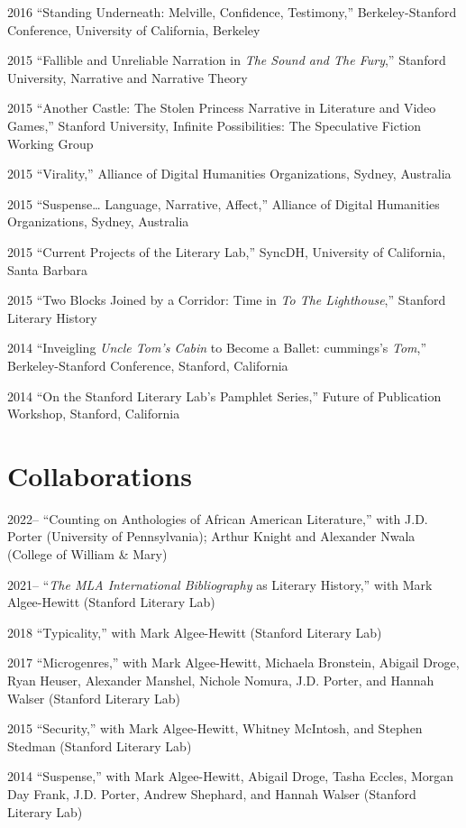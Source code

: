 \documentclass[12pt,letterpaper]{report}
\begin{document}
\begin{tablist}
	\item[2016] \tab{}\enquote{Standing Underneath: Melville, Confidence, Testimony,} Berkeley-Stanford Conference, University of California, Berkeley
	\item[2015] \tab{}\enquote{Fallible and Unreliable Narration in \emph{The Sound and The Fury},} Stanford University, Narrative and Narrative Theory
	\item[2015] \tab{}\enquote{Another Castle: The Stolen Princess Narrative in Literature and Video Games,} Stanford University, Infinite Possibilities: The Speculative Fiction Working Group
	\item[2015] \tab{}\enquote{Virality,} Alliance of Digital Humanities Organizations, Sydney, Australia
	\item[2015] \tab{}\enquote{Suspense… Language, Narrative, Affect,} Alliance of Digital Humanities Organizations, Sydney, Australia
	\item[2015] \tab{}\enquote{Current Projects of the Literary Lab,} SyncDH, University of California, Santa Barbara
	\item[2015] \tab{}\enquote{Two Blocks Joined by a Corridor: Time in \emph{To The Lighthouse},} Stanford Literary History
	\item[2014] \tab{}\enquote{Inveigling \emph{Uncle Tom's Cabin} to Become a Ballet: cummings's \emph{Tom},} Berkeley-Stanford Conference, Stanford, California
	\item[2014] \tab{}\enquote{On the Stanford Literary Lab's Pamphlet Series,} Future of Publication Workshop, Stanford, California
\end{tablist}


\section*{Collaborations}

\begin{tablist}
	\item[2022--] \tab{}\enquote{Counting on Anthologies of African American Literature,} with J.D. Porter (University of Pennsylvania); Arthur Knight and Alexander Nwala (College of William \& Mary)
	\item[2021--] \tab{}\enquote{\emph{The MLA International Bibliography} as Literary History,} with Mark Algee-Hewitt (Stanford Literary Lab)
	\item[2018] \tab{}\enquote{Typicality,} with Mark Algee-Hewitt (Stanford Literary Lab)
	\item[2017] \tab{}\enquote{Microgenres,} with Mark Algee-Hewitt, Michaela Bronstein, Abigail Droge, Ryan Heuser, Alexander Manshel, Nichole Nomura, J.D. Porter, and Hannah Walser (Stanford Literary Lab)
	\item[2015] \tab{}\enquote{Security,} with Mark Algee-Hewitt, Whitney McIntosh, and Stephen Stedman (Stanford Literary Lab)
	\item[2014] \tab{}\enquote{Suspense,} with Mark Algee-Hewitt, Abigail Droge, Tasha Eccles, Morgan Day Frank, J.D. Porter, Andrew Shephard, and Hannah Walser (Stanford Literary Lab)
\end{tablist}
\end{document}
